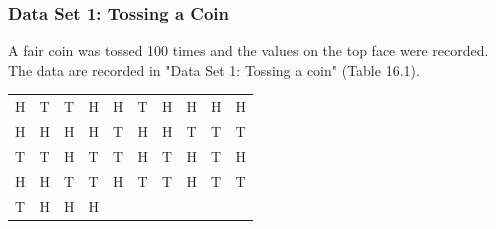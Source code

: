 \begin{description}[noitemsep]
\begin{description}[noitemsep]
            \subsubsection{ Data Set 1: Tossing a Coin}
            \nopagebreak
        \label{m39403*id200822}A fair coin was tossed 100 times and the values on the top face were recorded. The data are recorded in "Data Set 1: Tossing a coin" (Table 16.1).\par 
          \begin{table}[H]
        \begin{center}
      \label{m39403*uid25}
    \noindent
      \tablelasttail{}
      \begin{xtabular}[t]{|l|l|l|l|l|l|l|l|l|l|}\hline
        H &
        T &
        T &
        H &
        H &
        T &
        H &
        H &
        H &
        H%
     \tabularnewline{}
        H &
        H &
        H &
        H &
        T &
        H &
        H &
        T &
        T &
        T%
     \tabularnewline{}
        T &
        T &
        H &
        T &
        T &
        H &
        T &
        H &
        T &
        H%
     \tabularnewline{}
        H &
        H &
        T &
        T &
        H &
        T &
        T &
        H &
        T &
        T%
     \tabularnewline{}
        T &
        H &
        H &
        H &

\end{xtabular}
\end{center}
\end{table}
\end{description}
\end{description}
